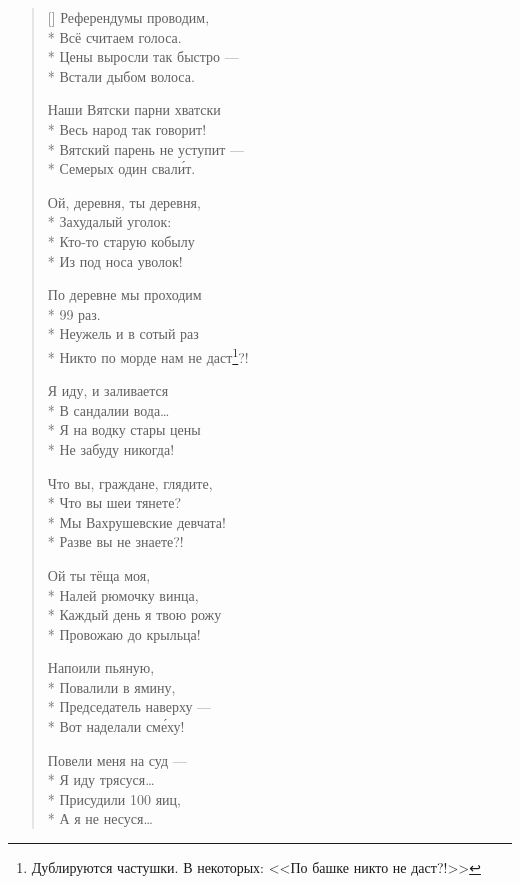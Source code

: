 \documentclass[a4paper,oneside,14pt]{scrbook}
\begin{document}
    \settowidth{\versewidth}{Наши Вятски парни хватски}
    \begin{verse}[\versewidth]
        Референдумы проводим,\\*
        Всё считаем голоса.\\*
        Цены выросли так быстро --- \\*
        Встали дыбом волоса.
        
        Наши Вятски парни хватски\\*
        Весь народ так говорит!\\*
        Вятский парень не уступит --- \\*
        Семерых один свал\'{и}т.
        
        Ой, деревня, ты деревня,\\*
        Захудалый уголок:\\*
        Кто-то старую кобылу\\*
        Из под носа уволок!
        
        По деревне мы проходим\\*
        99 раз.\\*
        Неужель и в сотый раз\\*
        Никто по морде нам не даст\footnote{Дублируются частушки. В некоторых: <<По башке никто не даст?!>>}?!
        
        Я иду, и заливается\\*
        В сандалии вода\ldots\\*
        Я на водку стары цены\\*
        Не забуду никогда!
        
        Что вы, граждане, глядите,\\*
        Что вы шеи тянете?\\*
        Мы Вахрушевские девчата!\\*
        Разве вы не знаете?!
        
        Ой ты тёща моя,\\*
        Налей рюмочку винца,\\*
        Каждый день я твою рожу\\*
        Провожаю до крыльца!
        
        Напоили пьяную,\\*
        Повалили в ямину,\\*
        Председатель наверху --- \\*
        Вот наделали см\'{е}ху!
        
        Повели меня на суд ---\\*
        Я иду трясуся\ldots\\*
        Присудили 100 яиц,\\*
        А я не несуся\ldots
        

\end{verse}
\end{document}
